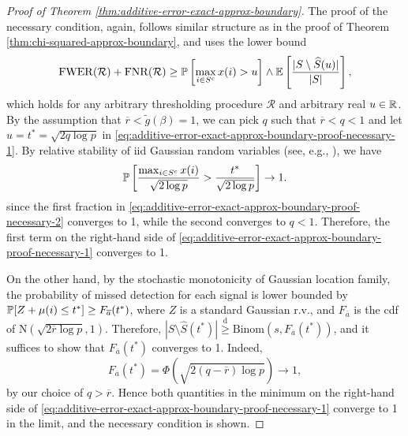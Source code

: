 \begin{proof}[Proof of Theorem \ref{thm:additive-error-exact-approx-boundary}]
The proof of the necessary condition, again, follows similar structure as in the proof of Theorem \ref{thm:chi-squared-approx-boundary}, and uses the lower bound
\begin{equation} \label{eq:additive-error-exact-approx-boundary-proof-necessary-1}
    \mathrm{FWER}(\mathcal{R}) + \mathrm{FNR}(\mathcal{R}) \ge \P\left[\max_{i\in S^c}x(i)>u\right] \wedge \E\left[\frac{|S\setminus \widehat{S}(u)|}{|S|}\right],
\end{equation}
which holds for any arbitrary thresholding procedure $\mathcal{R}$ and arbitrary real $u\in\R$.
By the assumption that $\overline{r}<\widetilde{g}(\beta)=1$, we can pick $q$ such that $\overline{r}<q<1$ and let $u = t^*=\sqrt{2q\log{p}}$ in \eqref{eq:additive-error-exact-approx-boundary-proof-necessary-1}.
By relative stability of iid Gaussian random variables (see, e.g., \cite{gao2018fundamental}), we have
\begin{equation} \label{eq:additive-error-exact-approx-boundary-proof-necessary-2}
    \P\left[\frac{\max_{i\in S^c} x(i)}{\sqrt{2\log{p}}} > \frac{t^*}{\sqrt{2\log{p}}}\right] \to 1.
\end{equation}
since the first fraction in \eqref{eq:additive-error-exact-approx-boundary-proof-necessary-2} converges to 1, while the second converges to $q<1$.
Therefore, the first term on the right-hand side of \eqref{eq:additive-error-exact-approx-boundary-proof-necessary-1} converges to 1.

On the other hand, by the stochastic monotonicity of Gaussian location family, the probability of missed detection for each signal is lower bounded by $\P[Z+\mu(i) \le t^*] \ge F_{\overline{a}}(t^*)$, where $Z$ is a standard Gaussian r.v., and $F_{\overline{a}}$ is the cdf of $\mathrm{N}(\sqrt{2\overline{r}\log{p}}, 1)$.
Therefore, $|{S}\setminus\widehat{S}(t^*)| \stackrel{\mathrm{d}}{\ge} \text{Binom}(s, {F_{\overline{a}}}(t^*))$, and it suffices to show that ${F_{\overline{a}}}(t^*)$ converges to 1.
Indeed,
\begin{equation*}
    {F_{\overline{a}}}(t^*) = \Phi(\sqrt{2(q-\overline{r})\log{p}}) \to 1,
\end{equation*}
by our choice of $q>\overline{r}$.
Hence both quantities in the minimum on the right-hand side of \eqref{eq:additive-error-exact-approx-boundary-proof-necessary-1} converge to 1 in the limit, and the necessary condition is shown.
\end{proof}


